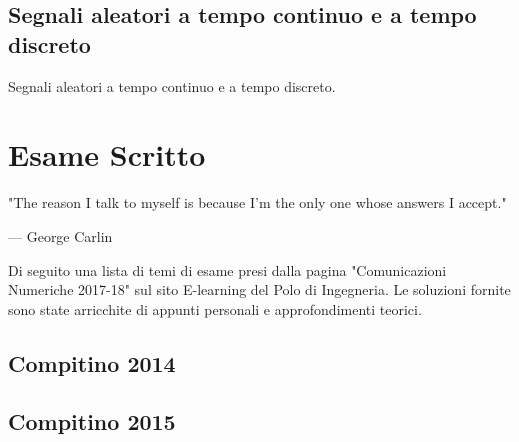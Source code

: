 \documentclass[12pt,oneside,openany]{memoir}
\numberwithin{equation}{subsection}
\begin{document}

\section{Segnali aleatori a tempo continuo e a tempo discreto}
Segnali aleatori a tempo continuo e a tempo discreto.


\chapter{Esame Scritto}
\epigraph{
	"The reason I talk to myself is because I'm the only one whose answers I
	accept."
}{--- \textup{George Carlin}}

Di seguito una lista di temi di esame presi dalla pagina "Comunicazioni
Numeriche 2017-18" sul sito E-learning del Polo di Ingegneria. Le soluzioni
fornite sono state arricchite di appunti personali e approfondimenti teorici.


\section{Compitino 2014}


\section{Compitino 2015}

\end{document}
